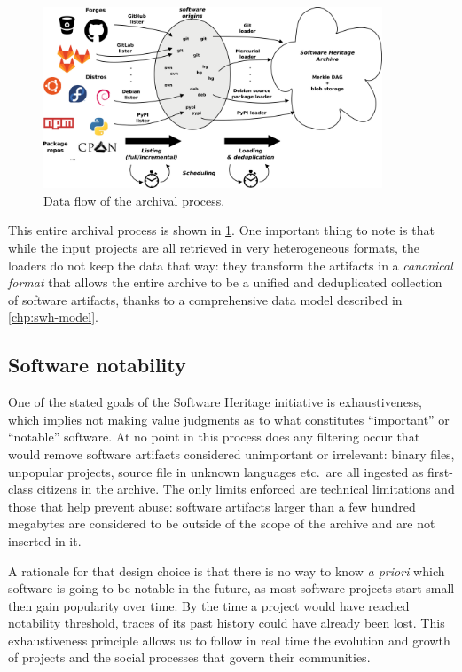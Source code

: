 \begin{figure}
\begin{center}
    \includegraphics[width=0.9\textwidth]{img/swh-dataflow}
\end{center}
\caption{Data flow of the archival process.}%
\label{fig:archival-data-flow}
\end{figure}

This entire archival process is shown in \cref{fig:archival-data-flow}. One
important thing to note is that while the input projects are all retrieved in
very heterogeneous formats, the loaders do not keep the data that way: they
transform the artifacts in a \emph{canonical format} that allows the entire
archive to be a unified and deduplicated collection of software artifacts,
thanks to a comprehensive data model described in \cref{chp:swh-model}.

\subsection{Software notability}

One of the stated goals of the Software Heritage initiative is exhaustiveness,
which implies not making value judgments as to what constitutes ``important''
or ``notable'' software. At no point in this process does any filtering occur
that would remove software artifacts considered unimportant or irrelevant:
binary files, unpopular projects, source file in unknown languages etc.\ are
all ingested as first-class citizens in the archive. The only limits enforced
are technical limitations and those that help prevent abuse: software artifacts
larger than a few hundred megabytes are considered to be outside of the scope
of the archive and are not inserted in it.

A rationale for that design choice is that there is no way to know \emph{a
priori} which software is going to be notable in the future, as most software
projects start small then gain popularity over time. By the time a project
would have reached notability threshold, traces of its past history could have
already been lost. This exhaustiveness principle allows us to follow in real
time the evolution and growth of projects and the social processes that govern
their communities.

